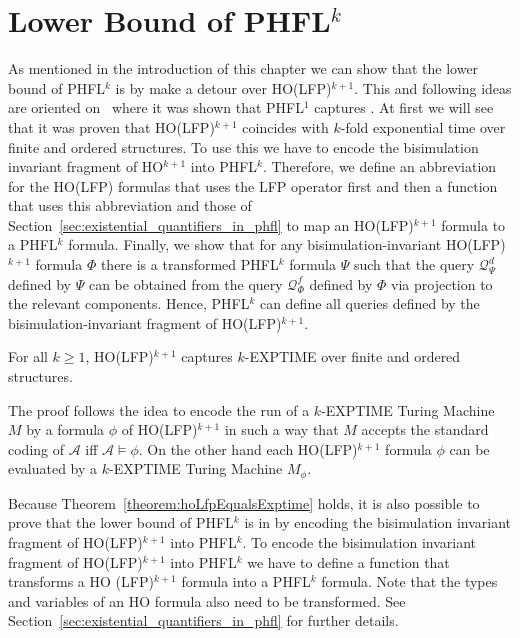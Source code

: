 
\section{Lower Bound of PHFL$^k$}\label{sec:lowerBoundOfPhfl}

As mentioned in the introduction of this chapter we can show that the lower bound of PHFL$^k$ is  by
make a detour over HO(LFP)$^{k+1}$. This and following ideas are oriented on~\cite{lange2014capturing} where it was
shown that PHFL$^1$ captures . At first we will see that it was proven that HO(LFP)$^{k +
1}$ coincides with $k$-fold exponential time over finite and ordered structures. To use this we have to encode the
bisimulation invariant fragment of HO$^{k+1}$ into PHFL$^k$. Therefore, we define an abbreviation for the HO(LFP)
formulas that uses the LFP operator first and then a function that uses this abbreviation and those of
Section~\ref{sec:existential_quantifiers_in_phfl} to map an HO(LFP)$^{k+1}$ formula to a PHFL$^k$ formula. Finally, we
show that for any bisimulation-invariant HO(LFP)$^{k+1}$ formula $\Phi$ there is a transformed PHFL$^k$ formula $\Psi$ such that the query $\mathcal{Q}^d_\Psi$ defined by $\Psi$ can be obtained from the query $\mathcal{Q}^f_\Phi$ defined by $\Phi$ via projection to the relevant components. Hence, PHFL$^k$ can define all queries defined by the bisimulation-invariant fragment of HO(LFP)$^{k+1}$.

\begin{theorem}{\cite{freireMartins2011descriptive}}\label{theorem:hoLfpEqualsExptime}
    For all $k \geq 1$, HO(LFP)$^{k + 1}$ captures $k$-EXPTIME over finite and ordered structures.
\end{theorem}

The proof follows the idea to encode the run of a $k$-EXPTIME Turing Machine $M$ by a formula $\phi$ of HO(LFP)$^{k +
1}$ in such a way that $M$ accepts the standard coding of $\mathcal{A}$ iff $\mathcal{A} \models \phi$. On the other hand each HO(LFP)$^{k +
1}$ formula $\phi$ can be evaluated by a $k$-EXPTIME Turing Machine $M_\phi$.

Because Theorem~\ref{theorem:hoLfpEqualsExptime} holds, it is also possible to prove that the lower bound of PHFL$^k$
is in  by encoding the bisimulation invariant fragment of HO(LFP)$^{k + 1}$ into PHFL$^k$. To encode the
bisimulation invariant fragment of HO(LFP)$^{k + 1}$ into PHFL$^k$ we have to define a function that transforms a HO
(LFP)$^{k + 1}$ formula into a PHFL$^k$ formula. Note that the types and variables of an HO formula also need to be
transformed. See Section~\ref{sec:existential_quantifiers_in_phfl} for further details.

